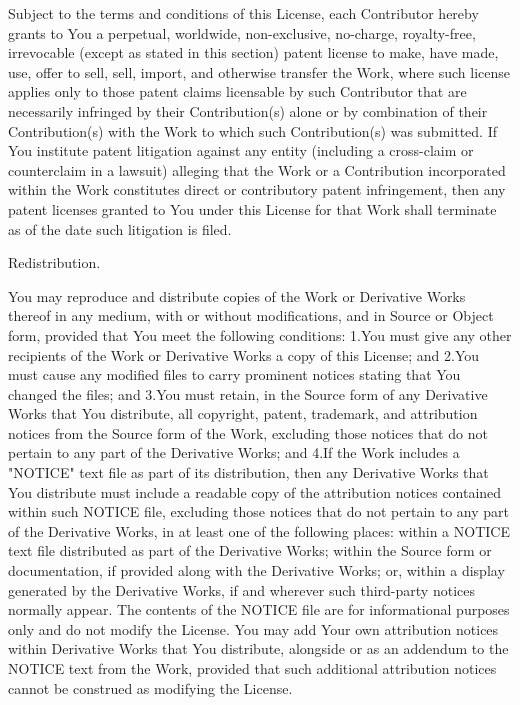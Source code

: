 Subject to the terms and conditions of this License, each Contributor hereby grants to You a perpetual, worldwide, non-\/exclusive, no-\/charge, royalty-\/free, irrevocable (except as stated in this section) patent license to make, have made, use, offer to sell, sell, import, and otherwise transfer the Work, where such license applies only to those patent claims licensable by such Contributor that are necessarily infringed by their Contribution(s) alone or by combination of their Contribution(s) with the Work to which such Contribution(s) was submitted. If You institute patent litigation against any entity (including a cross-\/claim or counterclaim in a lawsuit) alleging that the Work or a Contribution incorporated within the Work constitutes direct or contributory patent infringement, then any patent licenses granted to You under this License for that Work shall terminate as of the date such litigation is filed.


\begin{DoxyEnumerate}
\item Redistribution.
\end{DoxyEnumerate}

You may reproduce and distribute copies of the Work or Derivative Works thereof in any medium, with or without modifications, and in Source or Object form, provided that You meet the following conditions\+: 1.\+You must give any other recipients of the Work or Derivative Works a copy of this License; and 2.\+You must cause any modified files to carry prominent notices stating that You changed the files; and 3.\+You must retain, in the Source form of any Derivative Works that You distribute, all copyright, patent, trademark, and attribution notices from the Source form of the Work, excluding those notices that do not pertain to any part of the Derivative Works; and 4.\+If the Work includes a "{}\+NOTICE"{} text file as part of its distribution, then any Derivative Works that You distribute must include a readable copy of the attribution notices contained within such NOTICE file, excluding those notices that do not pertain to any part of the Derivative Works, in at least one of the following places\+: within a NOTICE text file distributed as part of the Derivative Works; within the Source form or documentation, if provided along with the Derivative Works; or, within a display generated by the Derivative Works, if and wherever such third-\/party notices normally appear. The contents of the NOTICE file are for informational purposes only and do not modify the License. You may add Your own attribution notices within Derivative Works that You distribute, alongside or as an addendum to the NOTICE text from the Work, provided that such additional attribution notices cannot be construed as modifying the License.

